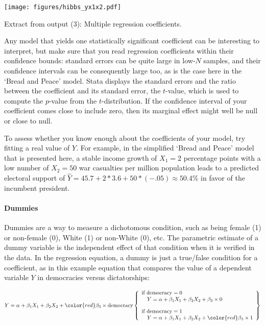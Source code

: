 	\begin{table}[htp]
		\texttt{[image: figures/hibbs\_yx1x2.pdf]}

	  	\caption[Extract from  output (3): Multiple regression coefficients]{\label{tbl:hibbs_yx1x2}
		Extract from  output (3): Multiple regression coefficients.\\
		}
	\end{table}%
	
	Any model that yields one statistically significant coefficient can be interesting to interpret, but make sure that you read regression coefficients within their confidence bounds: standard errors can be quite large in low-$N$ samples, and their confidence intervals can be consequently large too, as is the case here in the `Bread and Peace' model. Stata displays the standard errors and the ratio between the coefficient and its standard error, the $t$-value, which is used to compute the $p$-value from the $t$-distribution. If the confidence interval of your coefficient comes close to include zero, then its marginal effect might well be null or close to null.
	
	To assess whether you know enough about the coefficients of your model, try fitting a real value of $Y$. For example, in the simplified `Bread and Peace' model that is presented here, a stable income growth of $X_1=2$ percentage points with a low number of $X_2=50$ war casualties per million population leads to a predicted electoral support of $\hat Y = 45.7 + 2*3.6 + 50*(-.05) \approx 50.4\%$ in favor of the incumbent president.

	\paragraph{Dummies}%
	\label{sec:dummies}%
	Dummies are a way to measure a dichotomous condition, such as being female (1) or non-female (0), White (1) or non-White (0), etc. The parametric estimate of a dummy variable is the independent effect of that condition when it is verified in the data. In the regression equation, a dummy is just a true/false condition for a coefficient, as in this example equation that compares the value of a dependent variable $Y$ in democracies versus dictatorships:

	\[
	  Y = \alpha + \beta_1 X_1 + \beta_2 X_2 + {\color{red}\beta_3 \times \text{democracy}} \left\{ 
	  \begin{array}{l l}
	    \text{if~democracy}=0 \\ \quad Y = \alpha + \beta_1 X_1 + \beta_2 X_2 + \beta_3 \times 0\\[1em]
	    \text{if~democracy}=1 \\ \quad Y = \alpha + \beta_1 X_1 + \beta_2 X_2 + \color{red}\beta_3 \times 1\\
	  \end{array}\right\}
	\]
	
